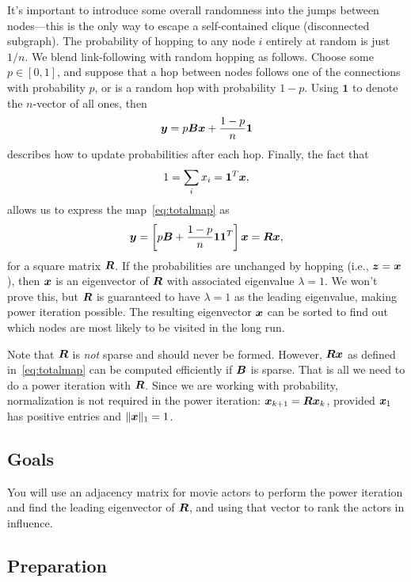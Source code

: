 \documentclass[11pt,twoside]{article}
\begin{document}
It's important to introduce some overall randomness into the jumps between nodes---this is the only way to escape a self-contained clique (disconnected subgraph). The probability of hopping to any node $i$ entirely at random is just $1/n$. We blend link-following with random hopping as follows. Choose some $p\in[0,1]$, and suppose that a hop between nodes follows one of the connections with probability $p$, or is a random hop with probability $1-p$. Using $\bm{1}$ to denote the $n$-vector of all ones, then 
\begin{equation}
  \label{eq:totalmap}
  \bm{y} = p \bm{B} \bm{x} + \frac{1-p}{n} \bm{1}
\end{equation}
describes how to update probabilities after each hop. Finally, the fact that 
\begin{equation}
  1 = \sum_i x_i = \bm{1}^T \bm{x},
\end{equation}
allows us to express the map~\eqref{eq:totalmap} as
\begin{equation}
  \label{eq:matvec}
  \bm{y} =  \left[ p \bm{B} + \frac{1-p}{n} \bm{1}\bm{1}^T \right] \bm{x} = \bm{R}\bm{x},
\end{equation}  
for a square matrix $\bm{R}$. If the probabilities are unchanged by hopping (i.e., $\bm{z}=\bm{x}$), then $\bm{x}$ is an eigenvector of $\bm{R}$ with associated eigenvalue $\lambda=1$. We won't prove this, but $\bm{R}$ is guaranteed to have $\lambda=1$ as the leading eigenvalue, making power iteration possible. The resulting eigenvector $\bm{x}$ can be sorted to find out which nodes are most likely to be visited in the long run.

Note that $\bm{R}$ is \emph{not} sparse and should never be formed. However, $\bm{R}\bm{x}$ as defined in~\eqref{eq:totalmap} can be computed efficiently if $\bm{B}$ is sparse. That is all we need to do a power iteration with $\bm{R}$. Since we are working with probability, normalization is not required in the power iteration: $\bm{x}_{k+1}=\bm{R} \bm{x}_k$, provided $\bm{x}_1$ has positive entries and $\|\bm{x}\|_1=1$.  


\subsection*{Goals}

You will use an adjacency matrix for movie actors to perform the power iteration and find the leading eigenvector of $\bm{R}$, and using that vector to rank the actors in influence.
    

\subsection*{Preparation}
\end{document}
